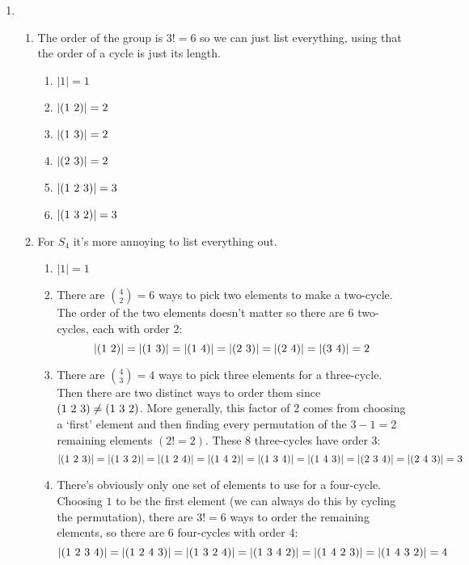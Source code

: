\documentclass[]{article}
\newcommand{\abs}[1]{\left\vert #1 \right\vert}
\newcommand*{\cycle}[1]{( \foreach \entry [count=\i] in {#1} {\ifnum\i>1\ \fi\entry})}
\begin{document}
\begin{enumerate}
\item 
\begin{enumerate}
\item The order of the group is $3! = 6$ so we can just list everything, using that the order of a cycle is just its length.
\begin{enumerate}
\item $\abs{1} = 1$
\item $\abs{\cycle{1,2}} = 2$
\item $\abs{\cycle{1,3}} = 2$
\item $\abs{\cycle{2,3}} = 2$
\item $\abs{\cycle{1,2,3}} = 3$
\item $\abs{\cycle{1,3,2}} = 3$
\end{enumerate}

\item For $S_4$ it's more annoying to list everything out.
\begin{enumerate}
\item $\abs{1} = 1$
\item There are $\binom{4}{2} = 6$ ways to pick two elements to make a two-cycle. The order of the two elements doesn't matter so there are 6 two-cycles, each with order 2:
\begin{equation}
\abs{\cycle{1,2}} = \abs{\cycle{1,3}} = \abs{\cycle{1,4}} = \abs{\cycle{2,3}} = \abs{\cycle{2,4}} = \abs{\cycle{3,4}} = 2
\end{equation}
\item There are $\binom{4}{3} = 4$ ways to pick three elements for a three-cycle. Then there are two distinct ways to order them since $\cycle{1,2,3} \neq \cycle{1,3,2}$. More generally, this factor of 2 comes from choosing a `first' element and then finding every permutation of the $3-1=2$ remaining elements $(2! = 2)$. These 8 three-cycles have order 3:
\begin{equation}
\abs{\cycle{1,2,3}} = \abs{\cycle{1,3,2}} = \abs{\cycle{1,2,4}} = \abs{\cycle{1,4,2}} = \abs{\cycle{1,3,4}} = \abs{\cycle{1,4,3}} = \abs{\cycle{2,3,4}} = \abs{\cycle{2,4,3}} = 3
\end{equation}
\item There's obviously only one set of elements to use for a four-cycle. Choosing $1$ to be the first element (we can always do this by cycling the permutation), there are $3! = 6$ ways to order the remaining elements, so there are 6 four-cycles with order 4:
\begin{equation}
\abs{\cycle{1,2,3,4}} = \abs{\cycle{1,2,4,3}} = \abs{\cycle{1,3,2,4}} = \abs{\cycle{1,3,4,2}} = \abs{\cycle{1,4,2,3}} = \abs{\cycle{1,4,3,2}} = 4

\end{equation}
\end{enumerate}
\end{enumerate}
\end{enumerate}
\end{document}
